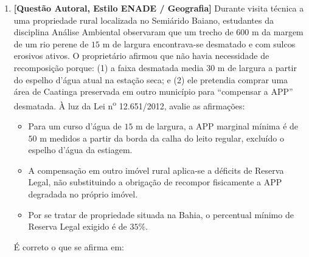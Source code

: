\begin{enumerate}[leftmargin=1.8em, itemsep=7pt]
  \item \textbf{[Questão Autoral, Estilo ENADE / Geografia]} Durante visita técnica a uma propriedade rural localizada no Semiárido Baiano, estudantes da disciplina Análise Ambiental observaram que um trecho de $600\text{ m}$ da margem de um rio perene de $15\text{ m}$ de largura encontrava-se desmatado e com sulcos erosivos ativos. O proprietário afirmou que não havia necessidade de recomposição porque: (1) a faixa desmatada media $30\text{ m}$ de largura a partir do espelho d'água atual na estação seca; e (2) ele pretendia comprar uma área de Caatinga preservada em outro município para ``compensar a APP'' desmatada. À luz da Lei n\textsuperscript{o} 12.651/2012, avalie as afirmações:
  \begin{itemize}[leftmargin=1.4em, itemsep=2pt]
    \item[I.] Para um curso d'água de $15\text{ m}$ de largura, a APP marginal mínima é de $50\text{ m}$ medidos a partir da borda da calha do leito regular, excluído o espelho d'água da estiagem.
    \item[II.] A compensação em outro imóvel rural aplica-se a déficits de Reserva Legal, não substituindo a obrigação de recompor fisicamente a APP degradada no próprio imóvel.
    \item[III.] Por se tratar de propriedade situada na Bahia, o percentual mínimo de Reserva Legal exigido é de $35\%$.
  \end{itemize}
  É correto o que se afirma em:


\end{enumerate}
